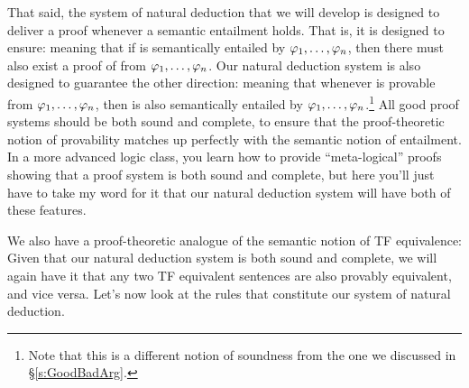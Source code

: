 That said, the system of natural deduction that we will develop is designed to deliver a proof whenever a semantic entailment holds.  That is, it is designed to ensure:
meaning that if \meta{\psi} is semantically entailed by $\mathcal{\varphi}_1, \ldots, \mathcal{\varphi}_n$, then there must also exist a proof of \meta{\psi} from $\mathcal{\varphi}_1, \ldots, \mathcal{\varphi}_n$.    Our natural deduction system is also designed to guarantee the other direction:
meaning that whenever \meta{\psi} is provable from $\mathcal{\varphi}_1, \ldots, \mathcal{\varphi}_n$, then \meta{\psi} is also semantically entailed by $\mathcal{\varphi}_1, \ldots, \mathcal{\varphi}_n$.\footnote{Note that this is a different notion of soundness from the one we discussed in \S \ref{s:GoodBadArg}.}  All good proof systems should be both sound and complete, to ensure that the proof-theoretic notion of provability matches up perfectly with the semantic notion of entailment. In a more advanced logic class, you learn how to provide ``meta-logical'' proofs showing that a proof system is both sound and complete, but here you'll just have to take my word for it that our natural deduction system will have both of these features.

We also have a proof-theoretic analogue of the semantic notion of TF equivalence:
Given that our natural deduction system is both sound and complete, we will again have it that any two TF equivalent sentences are also provably equivalent, and vice versa.  Let's now look at the rules that constitute our system of natural deduction.








